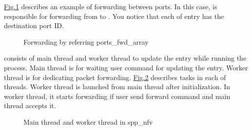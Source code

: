 \documentclass[a4paper,11pt,openany,oneside,english]{sphinxmanual}
\begin{document}
\begin{sphinxVerbatim}[commandchars=\\\{\},formatcom=\footnotesize]
  
   
   

   \PYG{p}{[}\PYG{p}{]}
\end{sphinxVerbatim}

\hyperref[\detokenize{design/spp_secondary:figure-design-spp-sec-nfv-port-fwd-array}]{Fig.\@ \ref{\detokenize{design/spp_secondary:figure-design-spp-sec-nfv-port-fwd-array}}} describes an example of
forwarding between ports. In this case,  is responsible for
forwarding from  to . You notice that each of 
entry has the destination port ID.

\begin{figure}[htbp]
\centering
\capstart

\noindent{}
\caption{Forwarding by referring ports\_fwd\_array}\label{\detokenize{design/spp_secondary:id1}}\label{\detokenize{design/spp_secondary:figure-design-spp-sec-nfv-port-fwd-array}}\end{figure}

 consists of main thread and worker thread to update the entry
while running the process. Main thread is for waiting user command for
updating the entry. Worker thread is for dedicating packet forwarding.
\hyperref[\detokenize{design/spp_secondary:figure-design-spp-sec-nfv-threads}]{Fig.\@ \ref{\detokenize{design/spp_secondary:figure-design-spp-sec-nfv-threads}}} describes tasks in each of
threads. Worker thread is launched from main thread after initialization.
In worker thread, it starts forwarding if user send forward command and
main thread accepts it.

\begin{figure}[htbp]
\centering
\capstart

\noindent{}
\caption{Main thread and worker thread in spp\_nfv}\label{\detokenize{design/spp_secondary:id2}}\label{\detokenize{design/spp_secondary:figure-design-spp-sec-nfv-threads}}\end{figure}
\end{document}
